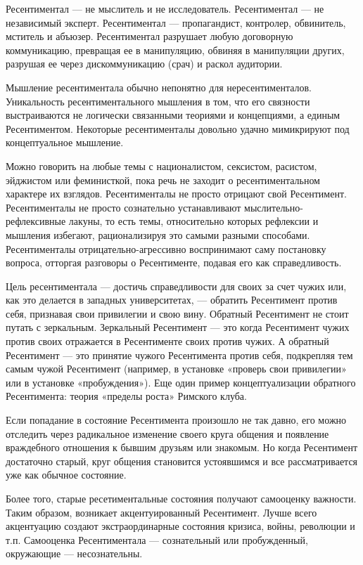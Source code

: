 Ресентиментал — не мыслитель и не исследователь. Ресентиментал — не независимый
эксперт. Ресентиментал — пропагандист, контролер, обвинитель, мститель и
абъюзер. Ресентиментал разрушает любую договорную коммуникацию, превращая ее в
манипуляцию, обвиняя в манипуляции других, разрушая ее через дискоммуникацию
(срач) и раскол аудитории.

Мышление ресентиментала обычно непонятно для нересентименталов. Уникальность
ресентиментального мышления в том, что его связности выстраиваются не логически
связанными теориями и концепциями, а единым Ресентиментом. Некоторые
ресентименталы довольно удачно мимикрируют под концептуальное мышление.

Можно говорить на любые темы с националистом, сексистом, расистом, эйджистом
или феминисткой, пока речь не заходит о ресентиментальном характере их
взглядов. Ресентименталы не просто отрицают свой Ресентимент. Ресентименталы не
просто сознательно устанавливают мыслительно-рефлексивные лакуны, то есть темы,
относительно которых рефлексии и мышления избегают, рационализируя это самыми
разными способами. Ресентименталы отрицательно-агрессивно воспринимают саму
постановку вопроса, отторгая разговоры о Ресентименте, подавая его как
справедливость.

Цель ресентиментала — достичь справедливости для своих за счет чужих или, как
это делается в западных университетах, — обратить Ресентимент против себя,
признавая свои привилегии и свою вину. Обратный Ресентимент не стоит путать с
зеркальным. Зеркальный Ресентимент — это когда Ресентимент чужих против своих
отражается в Ресентименте своих против чужих. А обратный Ресентимент — это
принятие чужого Ресентимента против себя, подкрепляя тем самым чужой
Ресентимент (например, в установке «проверь свои привилегии» или в установке
«пробуждения»). Еще один пример концептуализации обратного Ресентимента: теория
«пределы роста» Римского клуба.

Если попадание в состояние Ресентимента произошло не так давно, его можно
отследить через радикальное изменение своего круга общения и появление
враждебного отношения к бывшим друзьям или знакомым. Но когда Ресентимент
достаточно старый, круг общения становится устоявшимся и все рассматривается
уже как обычное состояние.

Более того, старые ресетиментальные состояния получают самооценку важности.
Таким образом, возникает акцентуированный Ресентимент. Лучше всего акцентуацию
создают экстраординарные состояния кризиса, войны, революции и т.п. Самооценка
Ресентиментала — сознательный или пробужденный, окружающие — несознательны.

